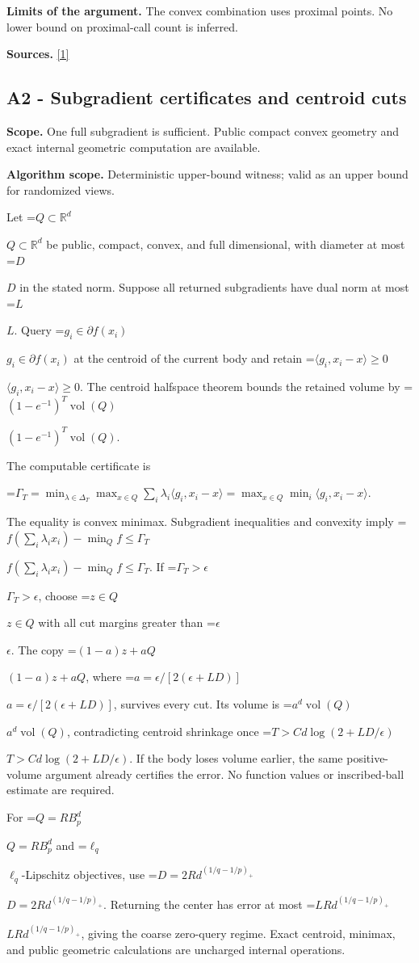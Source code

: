 \documentclass[10pt,a4paper]{article}
\newcommand{\AtlasMath}[1]{\par\begingroup\centering\setbox0=\hbox{$\displaystyle #1$}\ifdim\wd0>1.4\linewidth\typeout{ATLAS WIDE FORMULA: \the\wd0}\fi\ifdim\wd0>\linewidth\resizebox{\linewidth}{!}{\box0}\else\box0\fi\par\endgroup}
\newcommand{\AtlasInlineMath}[1]{\begingroup\setbox0=\hbox{$#1$}\ifdim\wd0>.4\linewidth\endgroup\AtlasMath{#1}\else\endgroup$#1$\fi}
\begin{document}
\textbf{Limits of the argument.} The convex combination uses proximal points. No lower bound on proximal-call count is inferred.

\textbf{Sources.} \href{https://www.tau.ac.il/~becka/FISTA.pdf}{[1]}

\subsection{A2 - Subgradient certificates and centroid cuts}
\textbf{Scope.} One full subgradient is sufficient. Public compact convex geometry and exact internal geometric computation are available.

\textbf{Algorithm scope.} Deterministic upper-bound witness; valid as an upper bound for randomized views.

Let \AtlasInlineMath{Q\subset\mathbb R^d} be public, compact, convex, and full dimensional, with diameter at most \AtlasInlineMath{D} in the stated norm. Suppose all returned subgradients have dual norm at most \AtlasInlineMath{L}. Query \AtlasInlineMath{g_i\in\partial f(x_i)} at the centroid of the current body and retain \AtlasInlineMath{\langle g_i,x_i-x\rangle\ge0}. The centroid halfspace theorem bounds the retained volume by \AtlasInlineMath{(1-e^{-1})^T\operatorname{vol}(Q)}.

The computable certificate is

\AtlasMath{\Gamma_T=\min_{\lambda\in\Delta_T}\max_{x\in Q}\sum_i\lambda_i\langle g_i,x_i-x\rangle
=\max_{x\in Q}\min_i\langle g_i,x_i-x\rangle.}

The equality is convex minimax. Subgradient inequalities and convexity imply
\AtlasInlineMath{f(\sum_i\lambda_ix_i)-\min_Qf\le\Gamma_T}.
If \AtlasInlineMath{\Gamma_T>\epsilon}, choose \AtlasInlineMath{z\in Q} with all cut margins greater than \AtlasInlineMath{\epsilon}. The copy \AtlasInlineMath{(1-a)z+aQ}, where \AtlasInlineMath{a=\epsilon/[2(\epsilon+LD)]}, survives every cut. Its volume is \AtlasInlineMath{a^d\operatorname{vol}(Q)}, contradicting centroid shrinkage once \AtlasInlineMath{T>C d\log(2+LD/\epsilon)}. If the body loses volume earlier, the same positive-volume argument already certifies the error. No function values or inscribed-ball estimate are required.

For \AtlasInlineMath{Q=RB_p^d} and \AtlasInlineMath{\ell_q}-Lipschitz objectives, use \AtlasInlineMath{D=2Rd^{(1/q-1/p)_+}}. Returning the center has error at most \AtlasInlineMath{LRd^{(1/q-1/p)_+}}, giving the coarse zero-query regime. Exact centroid, minimax, and public geometric calculations are uncharged internal operations.
\end{document}
